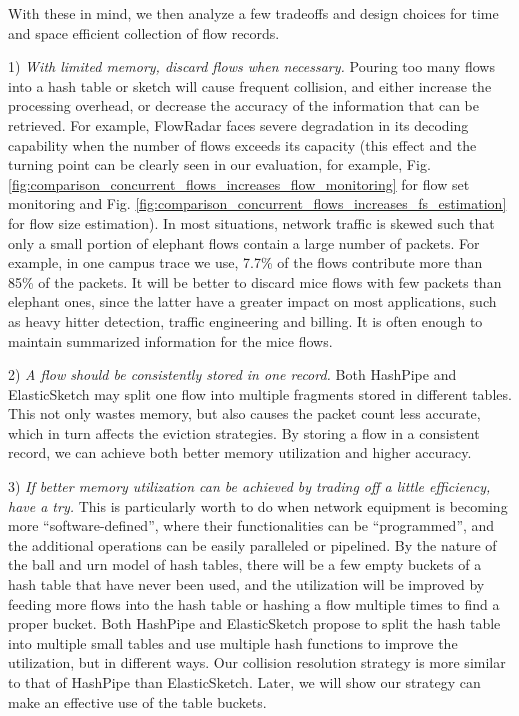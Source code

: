 With these in mind, we then analyze a few tradeoffs and design choices 
for time and space efficient collection of flow records.

1) {\em With limited memory, discard flows when necessary.} Pouring too many flows into a 
hash table or sketch will cause frequent collision, and either increase the processing overhead, 
or decrease the accuracy of the information that can be retrieved. 
For example, FlowRadar faces severe degradation in its decoding capability
 when the number of flows exceeds its capacity 
(this effect and the turning point can be clearly seen in our evaluation, 
for example, Fig. \ref{fig:comparison_concurrent_flows_increases_flow_monitoring} for flow set monitoring 
and Fig. \ref{fig:comparison_concurrent_flows_increases_fs_estimation} for flow size estimation).  
In most situations, network traffic is skewed such that 
only a small portion of elephant flows contain a large number of packets. 
For example, in one campus trace we use, 7.7\% of the flows contribute more than 85\% of the packets. 
It will be better to discard mice flows with few packets than elephant ones, 
since the latter have a greater impact on most applications, 
such as heavy hitter detection, traffic engineering and billing. It is often enough to maintain summarized information for the mice flows.

2) {\em A flow should be consistently stored in one record.} Both HashPipe and ElasticSketch 
may split one flow into multiple fragments stored in different tables. This not only wastes memory, 
but also causes the packet count less accurate, which in turn affects the eviction strategies.  
By storing a flow in a consistent record, we can achieve both better memory utilization and 
higher accuracy. 

3) {\em If better memory utilization can be achieved by trading off a little efficiency, have a try.} 
This is particularly worth to do when network equipment is becoming more ``software-defined'', 
where their functionalities can be  ``programmed'', 
and the additional operations can be easily paralleled or pipelined. 
By the nature of the ball and urn model \cite{urn} of hash tables, 
there will be a few empty buckets of a hash table that have never been used, and the utilization will be improved by feeding more flows into the hash table or hashing a flow multiple times to find a proper bucket. 
Both HashPipe and ElasticSketch propose to split the hash table into multiple small tables and use multiple hash functions to improve the utilization, 
but in different ways. Our collision resolution strategy is more similar to 
that of HashPipe than ElasticSketch. 
Later, we will show our strategy can make an effective use of the table buckets.

